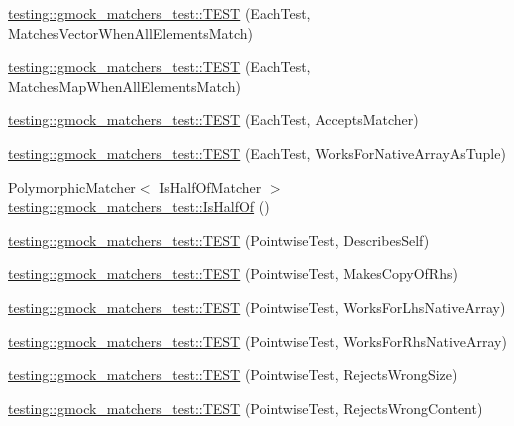 \begin{DoxyCompactItemize}
\item 
\hyperlink{namespacetesting_1_1gmock__matchers__test_a1310e7e85bf8ea8f2281850167e15465}{testing\+::gmock\+\_\+matchers\+\_\+test\+::\+T\+E\+ST} (Each\+Test, Matches\+Vector\+When\+All\+Elements\+Match)
\item 
\hyperlink{namespacetesting_1_1gmock__matchers__test_a53e7c1a04b8f178af52eeaa9f190cb64}{testing\+::gmock\+\_\+matchers\+\_\+test\+::\+T\+E\+ST} (Each\+Test, Matches\+Map\+When\+All\+Elements\+Match)
\item 
\hyperlink{namespacetesting_1_1gmock__matchers__test_a74f7c802ddb6879d3c76ff08d3e242b9}{testing\+::gmock\+\_\+matchers\+\_\+test\+::\+T\+E\+ST} (Each\+Test, Accepts\+Matcher)
\item 
\hyperlink{namespacetesting_1_1gmock__matchers__test_aef6eeafb03f698d16206836bbb6f05b9}{testing\+::gmock\+\_\+matchers\+\_\+test\+::\+T\+E\+ST} (Each\+Test, Works\+For\+Native\+Array\+As\+Tuple)
\item 
Polymorphic\+Matcher$<$ Is\+Half\+Of\+Matcher $>$ \hyperlink{namespacetesting_1_1gmock__matchers__test_ace0a8f64b108c7a9c32c2cac15185461}{testing\+::gmock\+\_\+matchers\+\_\+test\+::\+Is\+Half\+Of} ()
\item 
\hyperlink{namespacetesting_1_1gmock__matchers__test_a2c4c39058405e13e6c6b7fcf8e6bfe43}{testing\+::gmock\+\_\+matchers\+\_\+test\+::\+T\+E\+ST} (Pointwise\+Test, Describes\+Self)
\item 
\hyperlink{namespacetesting_1_1gmock__matchers__test_a9be60ebc74e280d7eb6668bfa316a765}{testing\+::gmock\+\_\+matchers\+\_\+test\+::\+T\+E\+ST} (Pointwise\+Test, Makes\+Copy\+Of\+Rhs)
\item 
\hyperlink{namespacetesting_1_1gmock__matchers__test_ad0e797104a482eba2d6c137cf9b676a5}{testing\+::gmock\+\_\+matchers\+\_\+test\+::\+T\+E\+ST} (Pointwise\+Test, Works\+For\+Lhs\+Native\+Array)
\item 
\hyperlink{namespacetesting_1_1gmock__matchers__test_adabf6a3ceda0024d630d2ece31e37f7c}{testing\+::gmock\+\_\+matchers\+\_\+test\+::\+T\+E\+ST} (Pointwise\+Test, Works\+For\+Rhs\+Native\+Array)
\item 
\hyperlink{namespacetesting_1_1gmock__matchers__test_a1f73a8fa9dd9560bd606a990444a81fe}{testing\+::gmock\+\_\+matchers\+\_\+test\+::\+T\+E\+ST} (Pointwise\+Test, Rejects\+Wrong\+Size)
\item 
\hyperlink{namespacetesting_1_1gmock__matchers__test_a135ad7162da91c9a234193fbbe5ef775}{testing\+::gmock\+\_\+matchers\+\_\+test\+::\+T\+E\+ST} (Pointwise\+Test, Rejects\+Wrong\+Content)

\end{DoxyCompactItemize}
